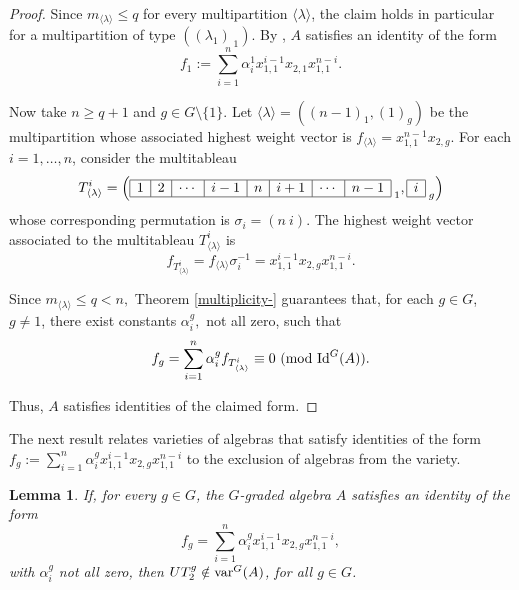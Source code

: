 \documentclass{amsart}
\newcommand{\gen}[1]{\ensuremath{\langle{#1}\rangle}}
\newcommand{\var}{\ensuremath{\textnormal{var}}}
\newcommand{\Idg}{\ensuremath{\textnormal{Id}^{G}}}
\newtheorem{lema}[teorema]{Lemma}
\numberwithin{equation}{section}
\begin{document}
\begin{proof}
 Since $m_{\langle \lambda \rangle }\leq q$ for every multipartition $\langle \lambda \rangle$, the claim holds in particular for a multipartition of type $((\lambda_1)_{\; 1})$. By \cite[Observation (a)]{MRZ}, $A$ satisfies an identity of the form $$f_1:= \sum\limits_{i=1}^n\alpha_i^1x^{i-1}_{1,1}x_{2,1}x^{n-i}_{1,1}.$$

 Now take $n\ge q+1$ and $g\in G\setminus\{1\}$. Let $ \gen{\lambda} =((n-1)_1, (1)_g)$ be the multipartition whose associated highest weight vector is 
$f_{{\langle \lambda \rangle}}=x_{1,1}^{n-1}x_{2,g}. $ 
For each $i=1,\ldots, n$, consider the multitableau 
	$$T_{\langle \lambda \rangle}^i= \left(%
	\begin{array}{|c|c|c|c|c|c|c|c|c| }
		\hline
		1   &2 & \cdots & i-1 & n & i+1 &\cdots  & n-1\\ 
		\hline
	\end{array}_{\; 1}, \begin{array}{|c| }
		\hline
		i  \\ 
		\hline
	\end{array}_{\; g}\right)$$
whose corresponding permutation is $\sigma_i = (n ~ i)$. The highest weight vector associated to the multitableau  $T_{\langle \lambda \rangle}^i$ is 
$$f_{T_{\langle \lambda \rangle}^i}=f_{\langle \lambda \rangle}\sigma_i^{-1}=x_{1,1}^{i-1}x_{2,g}x^{n-i}_{1,1}.$$


Since $m_{\langle \lambda \rangle}\le q< n,$  Theorem \ref{multiplicity-} guarantees that, for each $g\in G$, $g\neq 1$, there exist constants $\alpha_i^g,$ not all zero, such that 
$$f_g=\sum\limits_{i=1}^n\alpha_i^g f_{T_{\langle \lambda \rangle}^i}\equiv 0 ~(\mbox{mod} ~\Idg(A)). $$ 

	Thus, $A$ satisfies identities of the claimed form. 
\end{proof}

The next result relates varieties of algebras that satisfy  identities of the form $f_g:=\sum\limits_{i=1}^n\alpha_i^g x_{1,1}^{i-1}x_{2,g}x_{1,1}^{n-i}$ to the exclusion of algebras from the variety.

\begin{lema}\label{[GRADUATE R. F. Vieira 1]}  If, for every $g\in G$, the  $G$-graded algebra $A$ satisfies an identity of the form
$$f_g=\sum\limits_{i=1}^n\alpha_i^gx_{1,1}^{i-1}x_{2,g}x^{n-i}_{1,1},$$
with $\alpha_i^g$  not all zero, then $UT_2^{g} \notin \var^G(A)$, for all $g\in G$.   
\end{lema}
\end{document}
